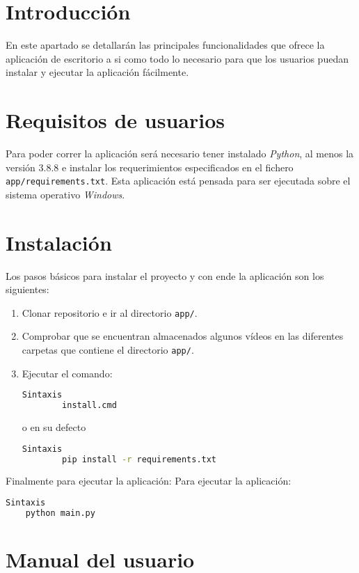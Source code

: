 
\section{Introducción}
En este apartado se detallarán las principales funcionalidades que ofrece la aplicación de escritorio a si como todo lo necesario para que los usuarios puedan instalar y ejecutar la aplicación fácilmente. 

\section{Requisitos de usuarios}
Para poder correr la aplicación será necesario tener instalado \textit{Python}, al menos la versión 3.8.8 e instalar los requerimientos especificados en el fichero \texttt{app/requirements.txt}. Esta aplicación está pensada para ser ejecutada sobre el sistema operativo \textit{Windows}.

\section{Instalación}
Los pasos básicos para instalar el proyecto y con ende la aplicación son los siguientes:
\begin{enumerate}
    \item Clonar repositorio e ir al directorio \texttt{app/}.
    \item Comprobar que se encuentran almacenados algunos vídeos en las diferentes carpetas que contiene el directorio \texttt{app/}.
    \item Ejecutar el comando:
    \newpage
    \begin{lstlisting}[language=Bash]
 Sintaxis
        install.cmd 
    \end{lstlisting}
    o en su defecto
    \begin{lstlisting}[language=Bash]
 Sintaxis
        pip install -r requirements.txt
    \end{lstlisting}
\end{enumerate}

Finalmente para ejecutar la aplicación:
Para ejecutar la aplicación:
\begin{lstlisting}[language=Bash]
 Sintaxis
    python main.py
\end{lstlisting}


\section{Manual del usuario}

